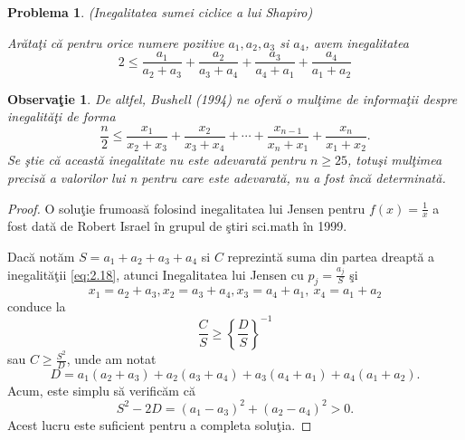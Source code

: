 \documentclass[a4paper,12pt,oneside]{report}
\newtheorem{problem}{Problema}
\newtheorem{remark}{Observa\c{t}ie}
\begin{document}
\begin{problem} (Inegalitatea sumei ciclice a lui Shapiro)

Ar\u{a}ta\c{t}i c\u{a} pentru orice numere pozitive
 \(a_{1} , a_{2} , a_{3}\)  si \(  a_{4}\), avem inegalitatea
 \begin{displaymath}
     2\leq \frac{a_{1}}{a_{2} + a_{3}} + \frac{a_{2}}{a_{3} + a_{4}} + \frac{a_{3}}{a_{4} + a_{1}} + \frac{a_{4}}{a_{1} + a_{2}} \label{eq:2.20} \tag{2.20}
 \end{displaymath}
 \end{problem}
 \begin{remark}
De altfel,  Bushell (1994) ne ofer\u{a} o mul\c{t}ime de informa\c{t}ii despre inegalit\u{a}\c{t}i de forma
\begin{displaymath}
    \frac{n}{2} \leq \frac{x_{1}}{x_{2} + x_{3}} + \frac{x_{2}}{x_{3} + x_{4}} + \cdots+ \frac{x_{n - 1}}{x_{n} + x_{1}} + \frac{x_{n}}{x_{1} + x_{2}}.
\end{displaymath}
Se \c{s}tie c\u{a} aceast\u{a} inegalitate nu este adevarat\u{a} pentru  \(n\geq 25\), totu\c{s}i mul\c{t}imea precis\u{a} a valorilor lui n pentru care este adevarat\u{a}, nu a fost \^{i}nc\u{a} determinat\u{a}.
\end{remark}
\begin{proof}
O solu\c{t}ie frumoas\u{a} folosind inegalitatea lui Jensen pentru \(f\left ( x \right ) = \frac{1}{x}\) a fost dat\u{a} de Robert Israel \^{i}n grupul de \c{s}tiri sci.math \^{i}n 1999.

Dac\u{a} not\u{a}m \(S = a_{1} + a_{2} + a_{3} + a_{4}\) si \(C\) reprezint\u{a} suma din partea dreapt\u{a} a inegalit\u{a}\c{t}ii \ref{eq:2.18}, atunci Inegalitatea lui Jensen cu \(p_{j} = \frac{a_{j}}{S}\) \c{s}i
\[x_{1} = a_{2} + a_{3}, x_{2} = a_{3} + a_{4}, x_{3} = a_{4} + a_{1},~x_{4} = a_{1} + a_{2}\] conduce la
\[\frac{C}{S} \geq \left \{ \frac{D}{S} \right \}^{-1}\]
 sau \(C \geq \frac{S^{2}}{D}\), unde am notat
\begin{displaymath}
    D = a_{1}\left ( a_{2} + a_{3} \right ) + a_{2}\left ( a_{3} + a_{4} \right ) + a_{3}\left ( a_{4} + a_{1} \right ) + a_{4}\left ( a_{1} + a_{2} \right ).
\end{displaymath}
Acum, este simplu s\u{a} verific\u{a}m c\u{a}
\begin{displaymath}
    S^{2} - 2D = \left ( a_{1} - a_{3} \right )^{2} + \left ( a_{2} - a_{4} \right )^{2}> 0.
\end{displaymath}
Acest lucru este suficient pentru a completa solu\c{t}ia.
\end{proof}
\end{document}

